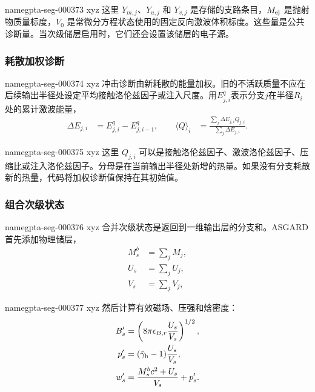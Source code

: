 \documentclass[twocolumn]{aastex702}
\makeatletter
\providecommand{\gptareaderanchor}[1]{\pdfdest name{#1} xyz}%
\providecommand{\gptareaderanchor}[1]{\special{pdf:dest (#1) [ @thispage /XYZ @xpos @ypos null ]}}%
\makeatother
\begin{document}
\gptareaderanchor{gpta-seg-000373}%
这里 \(Y_{m,j}\)、\(Y_{u,j}\) 和 \(Y_{v,j}\) 是存储的支路条目，\(M_{\rm ej}\) 是抛射物质量标度，\(V_0\) 是常微分方程状态使用的固定反向激波体积标度。这些量是公共诊断量。当次级储层启用时，它们还会设置该储层的电子源。

\subsubsection{耗散加权诊断}


\gptareaderanchor{gpta-seg-000374}%
冲击诊断由新耗散的能量加权。旧的不活跃质量不应在后续输出半径处设定平均接触洛伦兹因子或注入尺度。用\(E^q_{j,i}\)表示分支\(j\)在半径\(R_i\)处的累计激波能量，
\begin{equation}
\begin{aligned}
\Delta E_{j,i}&=E^q_{j,i}-E^q_{j,i-1},
\qquad
\langle Q\rangle_i&=
\frac{\sum_j \Delta E_{j,i}Q_{j,i}}
{\sum_j \Delta E_{j,i}}.
\end{aligned}
\end{equation}

\gptareaderanchor{gpta-seg-000375}%
这里 \(Q_{j,i}\) 可以是接触洛伦兹因子、激波洛伦兹因子、压缩比或注入洛伦兹因子。分母是在当前输出半径处新增的热量。如果没有分支耗散新的热量，代码将加权诊断值保持在其初始值。

\subsubsection{组合次级状态}


\gptareaderanchor{gpta-seg-000376}%
合并次级状态是返回到一维输出层的分支和。ASGARD首先添加物理储层，
\begin{equation}
\begin{aligned}
M_s^b&=\sum_j M_j,\\
U_s&=\sum_j U_j,\\
V_s&=\sum_j V_j,
\end{aligned}
\end{equation}

\gptareaderanchor{gpta-seg-000377}%
然后计算有效磁场、压强和焓密度：
\begin{equation}
\begin{aligned}
B'_s&=\left(8\pi\epsilon_{B,r}\frac{U_s}{V_s}\right)^{1/2},\\
p'_s&=(\hat\gamma_{\rm h}-1)\frac{U_s}{V_s},\\
w'_s&=\frac{M_s^b c^2+U_s}{V_s}+p'_s .
\end{aligned}
\end{equation}
\end{document}
